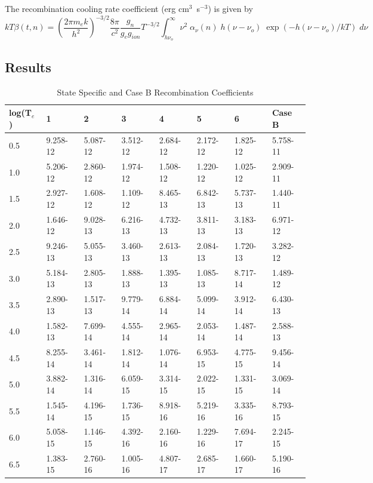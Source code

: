 The recombination cooling rate coefficient (erg cm$^3$~s$^{-3}$)
is given by
\begin{equation}
kT\beta \left( {t,n} \right) = {\left( {\frac{{2\pi {m_e}k}}{{{h^2}}}}
\right)^{ - 3/2}}\frac{{8\pi }}{{{c^2}}}\frac{{{g_n}}}{{{g_e}{g_{ion}}}}{T^{
- 3/2}}\int_{h{\nu _o}}^\infty  {{\nu ^2}\;{\alpha _\nu }\left( n
\right)\;h\left( {\nu  - {\nu _o}} \right)\;\exp \left( { - h\left( {\nu
- {\nu _o}} \right)/kT} \right)\;d\nu }
\end{equation}

\subsection{Results}

\begin{table}
\label{tab:RecombinCoeffic}
\caption{State Specific and Case B Recombination Coefficients}
\begin{tabular}{llllllll}
\hline
log(T$_e$)& 1&  2&  3&  4&  5&  6&  Case B\\
\hline
0.5& 9.258-12&
5.087-12& 3.512-12& 2.684-12& 2.172-12& 1.825-12& 5.758-11\\
1.0&
5.206-12& 2.860-12& 1.974-12& 1.508-12& 1.220-12& 1.025-12& 2.909-11\\
1.5&  2.927-12& 1.608-12& 1.109-12& 8.465-13& 6.842-13& 5.737-13&
1.440-11\\
2.0& 1.646-12& 9.028-13& 6.216-13& 4.732-13& 3.811-13&
3.183-13& 6.971-12\\
2.5& 9.246-13& 5.055-13& 3.460-13& 2.613-13&
2.084-13& 1.720-13& 3.282-12\\
3.0& 5.184-13& 2.805-13& 1.888-13&
1.395-13& 1.085-13& 8.717-14& 1.489-12\\
3.5& 2.890-13& 1.517-13&
9.779-14& 6.884-14& 5.099-14& 3.912-14& 6.430-13\\
4.0& 1.582-13&
7.699-14& 4.555-14& 2.965-14& 2.053-14& 1.487-14& 2.588-13\\
4.5&
8.255-14& 3.461-14& 1.812-14& 1.076-14& 6.953-15& 4.775-15& 9.456-14\\
5.0& 3.882-14& 1.316-14& 6.059-15& 3.314-15& 2.022-15& 1.331-15&
3.069-14\\
5.5& 1.545-14& 4.196-15& 1.736-15& 8.918-16& 5.219-16&
3.335-16& 8.793-15\\
6.0& 5.058-15& 1.146-15& 4.392-16& 2.160-16&
1.229-16& 7.694-17& 2.245-15\\
6.5& 1.383-15& 2.760-16& 1.005-16&
4.807-17& 2.685-17& 1.660-17& 5.190-16\\

\end{tabular}
\end{table}
